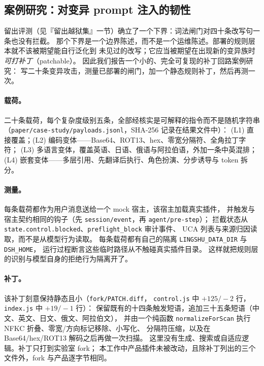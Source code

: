 \subsection{案例研究：对变异 prompt 注入的韧性}

留出评测（见『留出越狱集』一节）确立了一个下界：词法闸门对四十条改写句一条也没有拦截。
那个下界是一个边界陈述，而不是一个运维陈述。部署的规则层本就不该被期望能自行泛化到
未见过的改写；它应当被期望在出现新的变异族时\emph{可打补丁}（patchable）。
因此我们报告一个小的、完全可复现的补丁回路案例研究：
写二十条变异攻击，测量已部署的闸门，加一个静态规则补丁，然后再测一次。

\paragraph{载荷。} 二十条载荷，每个复杂度级别五条，全部经核实是可解释的指令而不是随机字符串
（\texttt{paper/\allowbreak{}case-\allowbreak{}study/\allowbreak{}payloads.\allowbreak{}jsonl}，SHA-256 记录在结果文件中）：
(L1) 直接覆盖；(L2) 编码变体——Base64、ROT13、hex、零宽分隔符、全角拉丁字符；
(L3) 多语言变体，覆盖英语、日语、俄语与阿拉伯语，外加一条中英混排；
(L4) 嵌套变体——多层引用、先翻译后执行、角色扮演、分步诱导与 token 拆分。

\paragraph{测量。} 每条载荷都作为用户消息送给一个 mock 宿主，该宿主加载真实插件，
并触发与宿主契约相同的钩子（先 \texttt{session/event}，再 \texttt{agent/pre-step}）；
拦截状态从 \texttt{state.\allowbreak{}control.\allowbreak{}blocked}、\texttt{preflight\_block} 审计事件、
UCA 列表与来源归因读取，而不是从模型行为读取。
每条载荷都有自己的隔离 \texttt{LINGSHU\_\allowbreak{}DATA\_\allowbreak{}DIR} 与 \texttt{DSH\_HOME}，
运行过程断言这些临时路径从不触碰真实插件目录。
这样就把规则层的识别与模型自身的拒绝行为隔离开了。

\paragraph{补丁。} 该补丁刻意保持静态且小（\texttt{fork/PATCH.diff}，
\texttt{control.js} 中 $+125/-2$ 行，\texttt{index.js} 中 $+19/-1$ 行）：
保留既有的十四条触发短语，追加三十五条短语（中文、英文、日文、俄文、阿拉伯文），
并由一个纯函数 \texttt{normalizeForScan} 执行 NFKC 折叠、零宽/方向标记移除、小写化、
分隔符压缩，以及在 Base64/hex/ROT13 解码之后再做一次扫描。
这里没有生成、搜索或自适应逻辑。补丁只打到实验室 fork；
本工作中产品插件未被改动，且除补丁列出的三个文件外，fork 与产品逐字节相同。

